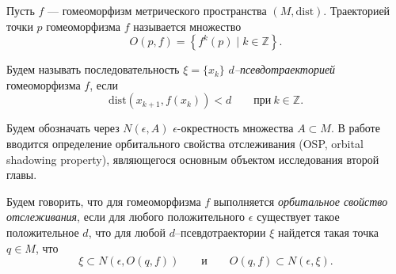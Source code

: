 \documentclass[12pt]{article}
\begin{document}
{Пусть $f$ --- гомеоморфизм метрического пространства $(M,\mbox{dist})$.  
Траекторией точки $p$ гомеоморфизма $f$ называется множество
$$O(p,f)=\left\{f^k(p)\mid k\in\mathbb{Z}\right\}.$$

Будем называть последователь\-ность $\xi=\{x_k\}$ 
\textit{$d$--псевдотраек\-торией} гомеоморфизма $f$, если 
$$\mbox{dist}(x_{k+1},f(x_k))<d\qquad\mbox{при}\ k\in\mathbb{Z}.$$



Будем обозначать через $N(\epsilon,A)$ $\epsilon$-окрестность множества $A\subset M$. 
В работе \cite{3} вводится определение орбитального свойства отслеживания (OSP, orbital shadowing property), являющегося основным объектом ис\-сле\-до\-ва\-ния второй главы. %

Будем говорить, что для гомеоморфизма $f$  выполняется \textit{орбитальное свойство отслеживания}, если для любого положительного $\epsilon$ существует такое положительное $d$, что для любой $d$--псевдотраек\-тории $\xi$ найдет\-ся та\-кая точка $q\in M$, что
$$\xi\subset N(\epsilon,O(q,f))\qquad\mbox{и}\qquad O(q,f)\subset N(\epsilon,\xi).$$

}
\end{document}
